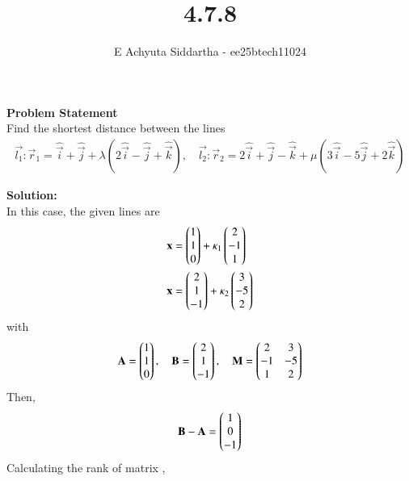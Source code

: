 \documentclass[journal]{IEEEtran}
\title{4.7.8}
\author{E Achyuta Siddartha - ee25btech11024}
\begin{document}
\maketitle

\noindent
\textbf{Problem Statement} \\
Find the shortest distance between the lines
\begin{align}
\vec{l_1}: \vec{r}_1 = \hat{\vec{i}} + \hat{\vec{j}} + \lambda (2\hat{\vec{i}} - \hat{\vec{j}} + \hat{\vec{k}}), \quad
\vec{l_2}: \vec{r}_2 = 2\hat{\vec{i}} + \hat{\vec{j}} - \hat{\vec{k}} + \mu (3\hat{\vec{i}} - 5\hat{\vec{j}} + 2\hat{\vec{k}})
\label{eq:given}
\end{align}

\vspace{1.5em}

\noindent
\textbf{Solution:} \\
In this case, the given lines are
\begin{align}
    \mathbf{x} &= \begin{pmatrix}1 \\ 1 \\ 0\end{pmatrix} + \kappa_1 \begin{pmatrix}2 \\ -1 \\ 1\end{pmatrix} \label{eq:1} \\
    \mathbf{x} &= \begin{pmatrix}2 \\ 1 \\ -1\end{pmatrix} + \kappa_2 \begin{pmatrix}3 \\ -5 \\ 2\end{pmatrix} \label{eq:2}
\end{align}
with
\begin{align}
    \mathbf{A} = \begin{pmatrix}1 \\ 1 \\ 0\end{pmatrix}, \quad \mathbf{B} = \begin{pmatrix}2 \\ 1 \\ -1\end{pmatrix}, \quad \mathbf{M} = \begin{pmatrix}2 & 3 \\ -1 & -5 \\ 1 & 2\end{pmatrix}
\end{align}
Then,
\begin{align}
    \mathbf{B} - \mathbf{A} = \begin{pmatrix}1 \\ 0 \\ -1\end{pmatrix}
\end{align}
Calculating the rank of  matrix ,
\end{document}
